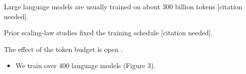 Large language models are usually trained on about 300 billion tokens [citation needed].

Prior scaling-law studies fixed the training schedule [citation needed].

The effect of the token budget is open .

\begin{itemize}
\item We train over 400 language models  (Figure 3).
\end{itemize}
